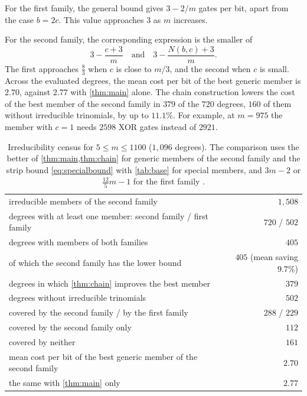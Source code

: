 \documentclass{ieeeaccess}
\theoremstyle{plain}
\theoremstyle{definition}
\begin{document}
For the first family, the general bound gives $3-2/m$ gates per bit, apart from
the case $b=2c$. This value approaches $3$ as $m$ increases.

For the second family, the corresponding expression is the smaller of
\[
  3-\frac{c+3}{m}
  \quad\text{and}\quad
  3-\frac{N(b,c)+3}{m}.
\]
The first approaches $\tfrac83$ when $c$ is close to $m/3$, and the second when
$c$ is small. Across the evaluated degrees, the mean cost per bit of the best
generic member is $2.70$, against $2.77$ with \cref{thm:main} alone. The chain
construction lowers the cost of the best member of the second family in $379$
of the $720$ degrees, $160$ of them without irreducible trinomials, by up to
$11.1\%$. For example, at $m=975$ the member with $c=1$ needs $2598$ XOR gates
instead of $2921$.

\begin{table}[t]
\centering\small
\caption{Irreducibility census for
$5\le m\le1100$ ($1,096$ degrees).
The comparison uses the better of \cref{thm:main,thm:chain}
for generic members of the second family
and the strip bound \eqref{eq:specialbound}
with \cref{tab:base} for special members,
and $3m-2$ or $\tfrac{12}{5}m-1$ for the
first family \cite{BCP2019}.}
\label{tab:census}
\begin{tabular}{@{}l r@{}}
\toprule
irreducible members of the second family & $1,508$\\
degrees with at least one member: second family / first family & $720$ / $502$\\
degrees with members of both families & $405$\\
\quad of which the second family has the lower bound & $405$ (mean saving $9.7\%$)\\
degrees in which \cref{thm:chain} improves the best member & $379$\\
degrees without irreducible trinomials & $502$\\
\quad covered by the second family / by the first family & $288$ / $229$\\
\quad covered by the second family only & $112$\\
\quad covered by neither & $161$\\
mean cost per bit of the best generic member of the second family & $2.70$\\
\quad the same with \cref{thm:main} only & $2.77$\\
\bottomrule
\end{tabular}
\end{table}
\end{document}
